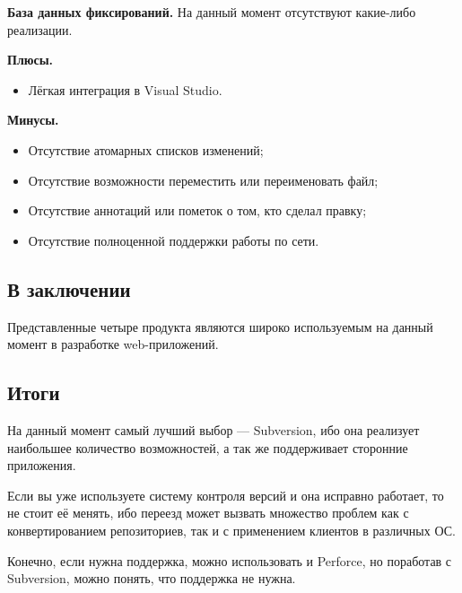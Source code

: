 \textbf{База данных фиксирований.} На данный момент отсутствуют какие-либо реализации.

\textbf{Плюсы.}
\begin{itemize}
\item Лёгкая интеграция в Visual Studio.
\end{itemize}



\textbf{Минусы.}
\begin{itemize}
\item Отсутствие атомарных списков изменений;
\item Отсутствие возможности переместить или переименовать файл;
\item Отсутствие аннотаций или пометок о том, кто сделал правку;
\item Отсутствие полноценной поддержки работы по сети.
\end{itemize}

\subsection{ В заключении } \label{sect3_4_6}

Представленные четыре продукта являются широко используемым на данный момент в разработке web-приложений.

\subsection{ Итоги } \label{sect3_4_7}

На данный момент самый лучший выбор --- Subversion, ибо она реализует наибольшее количество возможностей, а так же поддерживает сторонние приложения.

Если вы уже используете систему контроля версий и она исправно работает, то не стоит её менять, ибо переезд может вызвать множество проблем как с конвертированием репозиториев, так и с применением клиентов в различных ОС.

Конечно, если нужна поддержка, можно использовать и Perforce, но поработав с Subversion, можно понять, что поддержка не нужна.





 
 
 

 



































\clearpage



